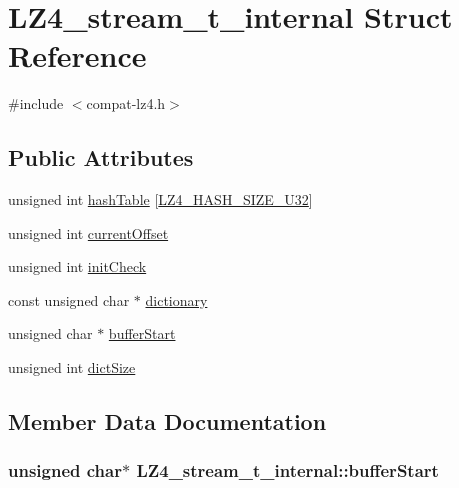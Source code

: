 \hypertarget{struct_l_z4__stream__t__internal}{}\section{L\+Z4\+\_\+stream\+\_\+t\+\_\+internal Struct Reference}
\label{struct_l_z4__stream__t__internal}


{\ttfamily \#include $<$compat-\/lz4.\+h$>$}

\subsection*{Public Attributes}
\begin{DoxyCompactItemize}
\item 
unsigned int \hyperlink{struct_l_z4__stream__t__internal_a822eb4986a8d75266ff28ab2c8905c25}{hash\+Table} \mbox{[}\hyperlink{compat-lz4_8h_a75fa199d8ad0949f67b62054171dc473}{L\+Z4\+\_\+\+H\+A\+S\+H\+\_\+\+S\+I\+Z\+E\+\_\+\+U32}\mbox{]}
\item 
unsigned int \hyperlink{struct_l_z4__stream__t__internal_a22283b1308210ae2916e67b5f0f6c72d}{current\+Offset}
\item 
unsigned int \hyperlink{struct_l_z4__stream__t__internal_aa37594c27fdfa2bdfd4176fd599819ce}{init\+Check}
\item 
const unsigned char $\ast$ \hyperlink{struct_l_z4__stream__t__internal_ad2609dc858757d096df15c144f6f710a}{dictionary}
\item 
unsigned char $\ast$ \hyperlink{struct_l_z4__stream__t__internal_a1f55fe5e76de1c8df286c4469527640d}{buffer\+Start}
\item 
unsigned int \hyperlink{struct_l_z4__stream__t__internal_a2414cc6dbd4a6664bd012d439df1e830}{dict\+Size}
\end{DoxyCompactItemize}


\subsection{Member Data Documentation}
\hypertarget{struct_l_z4__stream__t__internal_a1f55fe5e76de1c8df286c4469527640d}{}
\subsubsection[{buffer\+Start}]{\setlength{\rightskip}{0pt plus 5cm}unsigned char$\ast$ L\+Z4\+\_\+stream\+\_\+t\+\_\+internal\+::buffer\+Start}\label{struct_l_z4__stream__t__internal_a1f55fe5e76de1c8df286c4469527640d}
\hypertarget{struct_l_z4__stream__t__internal_a22283b1308210ae2916e67b5f0f6c72d}{}
